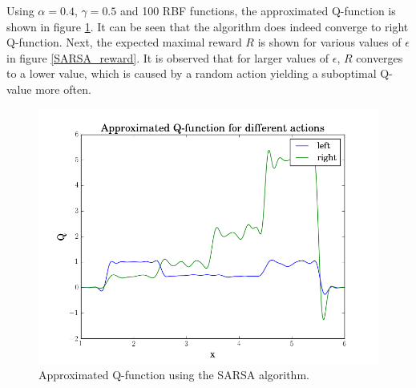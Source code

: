 \documentclass [a4paper] {report}
\begin{document}
	Using $\alpha=0.4$, $\gamma=0.5$ and 100 RBF functions, the approximated Q-function is shown in figure \ref{SARSA_Qfunc}. It can be seen that the algorithm does indeed converge to right Q-function. Next, the expected maximal reward $R$ is shown for various values of $\epsilon$ in figure \ref{SARSA_reward}. It is observed that for larger values of $\epsilon$, $R$ converges to a lower value, which is caused by a random action yielding a suboptimal Q-value more often. 

	\begin{figure}[H]
		\begin{center}
			\includegraphics[scale=0.4]{Images/SARSA_Q_Approx.png}
			\caption{Approximated Q-function using the SARSA algorithm.}
			\label{SARSA_Qfunc}
		\end{center}
	\end{figure}
		
\end{document}
